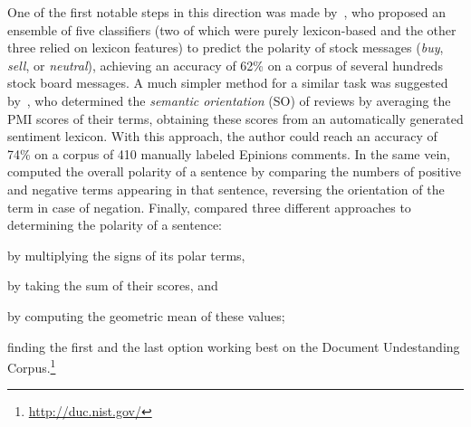 One of the first notable steps in this direction was made
by~\citet{Das:01}, who proposed an ensemble of five classifiers (two
of which were purely lexicon-based and the other three relied on
lexicon features) to predict the polarity of stock messages
(\emph{buy}, \emph{sell}, or \emph{neutral}), achieving an accuracy of
62\% on a corpus of several hundreds stock board messages.  A much
simpler method for a similar task was suggested by~\citet{Turney:02},
who determined the \emph{semantic orientation} (SO) of reviews by
averaging the PMI scores of their terms, obtaining these scores from
an automatically generated sentiment lexicon.  With this approach, the
author could reach an accuracy of 74\% on a corpus of 410 manually
labeled Epinions comments.  In the same vein, \citet{Hu:04} computed
the overall polarity of a sentence by comparing the numbers of
positive and negative terms appearing in that sentence, reversing the
orientation of the term in case of negation.  Finally, \citet{Kim:04}
compared three different approaches to determining the polarity of a
sentence:
\begin{inparaenum}[(i)]
\item by multiplying the signs of its polar terms,
\item by taking the sum of their scores, and
\item by computing the geometric mean of these values;
\end{inparaenum}
finding the first and the last option working best on the Document
Undestanding Corpus.\footnote{\url{http://duc.nist.gov/}}



